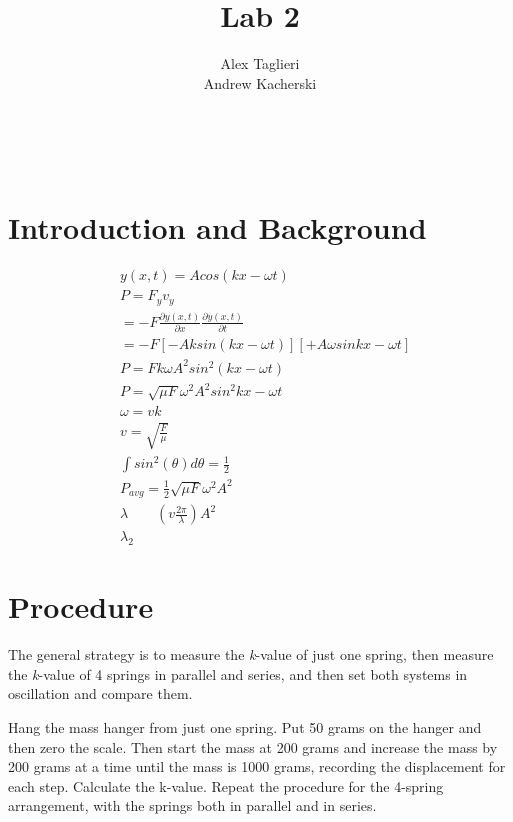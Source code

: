 \documentclass[]{article}
\title{Lab 2}
\author{
	Alex Taglieri
	\\
	Andrew Kacherski
}
\begin{document}
	\maketitle
	\newpage
	\
	\raggedright
	
	
	\section{Introduction and Background}
	
	
	
	\begin{equation}\label{parallelInSeries2}
	\begin{split}
	&y(x,t) = Acos(kx-\omega t)\\
	&P=F_y v_y\\
	&=-F \frac{\partial y(x,t)}{\partial x} \frac{\partial y(x,t)}{\partial t}\\
	&=-F [-A k sin(kx - \omega t)] [+A \omega sin{kx - \omega t}]\\
	&P=Fk \omega A^2 sin^2(kx- \omega t)\\
	&P= \sqrt{\mu F} \omega^2 A^2 sin^2{kx-\omega t}\\
	&\omega = vk\\
	&v=\sqrt{\frac{F}{\mu}}\\
	&\int sin^2(\theta) d \theta = \frac{1}{2} \\
	&P_{avg} = \frac{1}{2} \sqrt{\mu F} \omega^2 A^2 \\
	&	\lambda \qquad (v \frac{2 \pi}{\lambda}) A^2\\
	&	\lambda_2
	\end{split}
	\end{equation}
	
	
	
	
	\section{Procedure}
	
	The general strategy is to measure the \textit{k}-value of just one spring, then measure the \textit{k}-value of 4 springs in parallel and series, and then set both systems in oscillation and compare them.
	
	Hang the mass hanger from just one spring. Put 50 grams on the hanger and then zero the scale. Then start the mass at 200 grams and increase the mass by 200 grams at a time until the mass is 1000 grams, recording the displacement for each step. Calculate the k-value. 
	Repeat the procedure for the 4-spring arrangement, with the springs both in parallel and in series.
	
\end{document}

